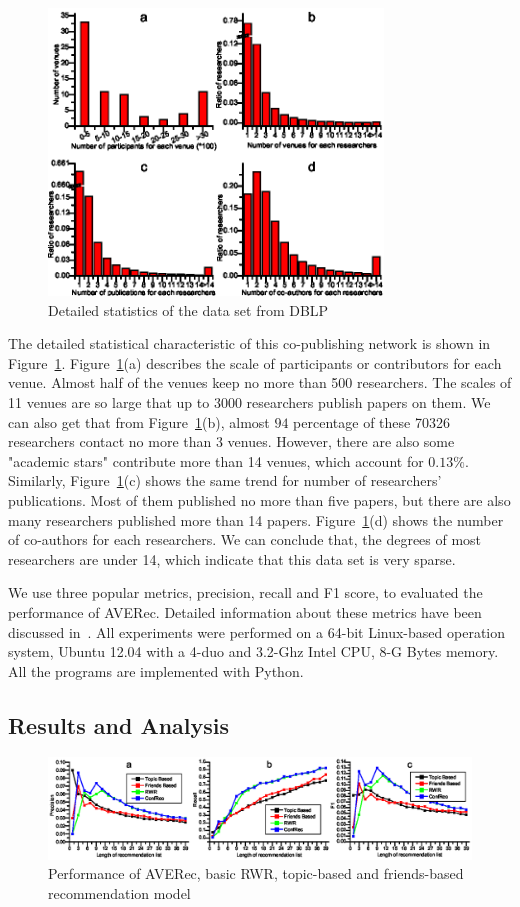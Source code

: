 \documentclass[9pt]{acm_proc_article-sp}
\begin{document}
\begin{figure}[t]
\centering
\includegraphics [width=3.5in]{Fig3.eps}
\caption{Detailed statistics of the data set from DBLP}
\label{fig3}
\end{figure}
The detailed statistical characteristic of this co-publishing network is shown in Figure~\ref{fig3}. Figure~\ref{fig3}(a) describes the scale of participants or contributors for each venue. Almost half of the venues keep no more than 500 researchers. The scales of 11 venues are so large that up to 3000 researchers publish papers on them. We can also get that from Figure~\ref{fig3}(b), almost $94$ percentage of these 70326 researchers contact no more than 3 venues. However, there are also some "academic stars" contribute more than 14 venues, which account for $0.13\%$. Similarly, Figure~\ref{fig3}(c) shows the same trend for number of researchers' publications. Most of them published no more than five papers, but there are also many researchers published more than 14 papers. Figure~\ref{fig3}(d) shows the number of co-authors for each researchers. We can conclude that, the degrees of most researchers are under 14, which indicate that this data set is very sparse.


We use three popular metrics, precision, recall and F1 score, to evaluated the performance of AVERec. Detailed information about these metrics have been discussed in~\cite{xia2014mvcwalker}. All experiments were performed on a 64-bit Linux-based operation system, Ubuntu 12.04 with a 4-duo and 3.2-Ghz Intel CPU, 8-G Bytes memory. All the programs are implemented with Python.

\subsection{Results and Analysis}
\begin{figure}[t]
\centering
\includegraphics [width=\textwidth]{Fig4.eps}
\caption{Performance of AVERec, basic RWR, topic-based and friends-based recommendation model}
\label{fig4}
\end{figure}
\end{document}

